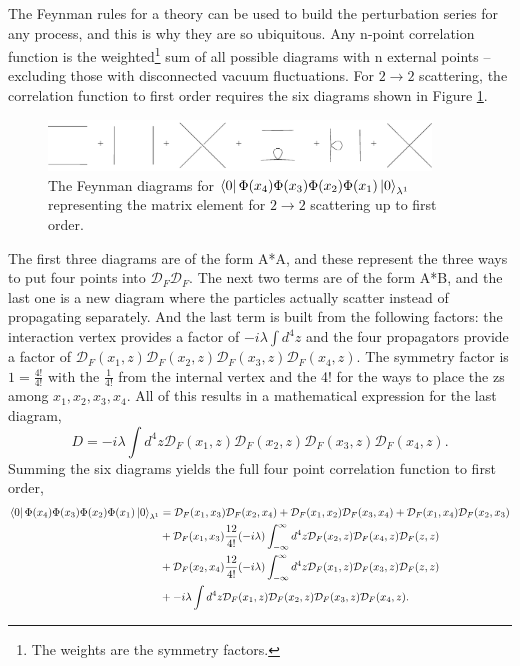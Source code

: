 The Feynman rules for a theory can be used to build the perturbation series for any process, and this is why they are so ubiquitous. Any n-point correlation function is the weighted\footnote{The weights are the symmetry factors.} sum of all possible diagrams with n external points -- excluding those with disconnected vacuum fluctuations. For $2 \rightarrow 2$ scattering, the correlation function to first order requires the six diagrams shown in Figure \ref{fig:feyn2-2}. 
\begin{figure}[h!]
  \centering
  \includegraphics[width=4in]{images/phi4_2-2_scattering.pdf}
  \caption
   {The Feynman diagrams for $\bra{0}\Phi(x_4)\Phi(x_3)\Phi(x_2)\Phi(x_1)\ket{0}_{\lambda^1}$ representing the matrix element for $2\rightarrow 2$ scattering up to first order.}
  \label{fig:feyn2-2}
\end{figure}
The first three diagrams are of the form A*A, and these represent the three ways to put four points into $\mathcal{D}_F\mathcal{D}_F$. The next two terms are of the form A*B, and the last one is a new diagram where the particles actually scatter instead of propagating separately. And the last term is built from the following factors: the interaction vertex provides a factor of $-i\lambda\int d^4z$ and the four propagators provide a factor of $\mathcal{D}_F(x_1,z)\mathcal{D}_F(x_2,z)\mathcal{D}_F(x_3,z)\mathcal{D}_F(x_4,z)$. The symmetry factor is $1 = \frac{4!}{4!}$ with the $\frac{1}{4!}$ from the internal vertex and the 4! for the ways to place the zs among $x_1, x_2, x_3, x_4$. All of this results in a mathematical expression for the last diagram, 
\begin{equation}
D = -i\lambda\int d^4z\mathcal{D}_F(x_1,z)\mathcal{D}_F(x_2,z)\mathcal{D}_F(x_3,z)\mathcal{D}_F(x_4,z).
\end{equation}
Summing the six diagrams yields the full four point correlation function to first order,
\begin{equation}
\begin{split}
\bra{0}\Phi(x_4)\Phi(x_3)\Phi(x_2)\Phi(x_1)\ket{0}_{\lambda^1} &= \mathcal{D}_F(x_1,x_3)\mathcal{D}_F(x_2,x_4) + \mathcal{D}_F(x_1,x_2)\mathcal{D}_F(x_3,x_4) 
                                                                   + \mathcal{D}_F(x_1,x_4)\mathcal{D}_F(x_2,x_3) \\ 
 &+ \mathcal{D}_F(x_1,x_3)\frac{12}{4!}(-i\lambda)\int_{-\infty}^{\infty} d^4z \mathcal{D}_F(x_2,z) \mathcal{D}_F(x_4,z) \mathcal{D}_F(z,z) \\
 &+ \mathcal{D}_F(x_2,x_4)\frac{12}{4!}(-i\lambda)\int_{-\infty}^{\infty} d^4z \mathcal{D}_F(x_1,z) \mathcal{D}_F(x_3,z) \mathcal{D}_F(z,z) \\
 &+ -i\lambda\int d^4z\mathcal{D}_F(x_1,z)\mathcal{D}_F(x_2,z)\mathcal{D}_F(x_3,z)\mathcal{D}_F(x_4,z).
\end{split}
\end{equation}
